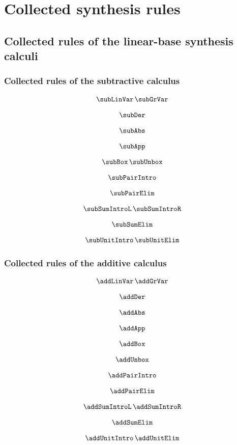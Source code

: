 \chapter{Collected synthesis rules}
\section{Collected rules of the linear-base synthesis calculi}
\label{app:linear-base}

\subsection{Collected rules of the subtractive calculus}
\label{app:subtractive}

\begin{align*}
\begin{array}{c}
  \subLinVar
  \,
  \subGrVar
\\[1em]
  \subDer
\\[1em]
  \subAbs
\\[1em]
  \subApp
\\[1em]
  \subBox
  \,
  \subUnbox
\\[1em]
  \subPairIntro
\\[1em]
  \subPairElim
\\[1em]
  \subSumIntroL
  \,
  \subSumIntroR
\\[1em]
  \subSumElim
\\[1em]
  \subUnitIntro
  \,
  \subUnitElim
    \end{array}
  \end{align*}

\subsection{Collected rules of the additive calculus}
\label{app:additive}


{\small{
\begin{align*}
\begin{array}{c}
  \addLinVar
  \,
  \addGrVar
\\[1em]
  \addDer
\\[1em]
  \addAbs
\\[1em]
  \addApp
\\[1em]
  \addBox
  \\[1em]
  \addUnbox
\\[1em]
  \addPairIntro
\\[1em]
  \addPairElim
\\[1em]
  \addSumIntroL
  \,
  \addSumIntroR
\\[1em]
  \addSumElim
\\[1em]
  \addUnitIntro
  \,
  \addUnitElim
      \end{array}
  \end{align*}
  }}

